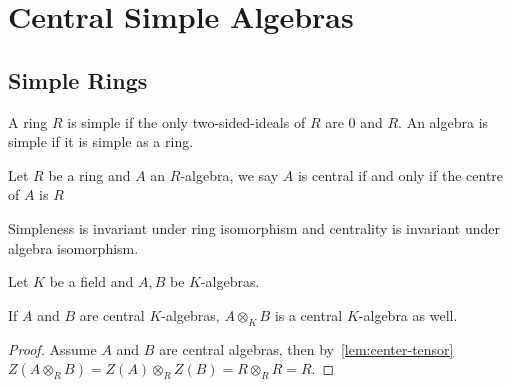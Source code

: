 \chapter{Central Simple Algebras}\label{chap:csa}

\section{Simple Rings}\label{sec:simple-ring}

\begin{definition} A ring $R$ is simple if the only two-sided-ideals of $R$ are ${0}$ and $R$. An algebra is simple if it is simple as a ring.
  \leanok
\end{definition}

\begin{definition}
  Let $R$ be a ring and $A$ an $R$-algebra, we say $A$ is central if and only if the centre of $A$ is $R$
  \leanok
\end{definition}

\begin{remark}
  Simpleness is invariant under ring isomorphism and centrality is invariant under algebra isomorphism.
\end{remark}

Let $K$ be a field and $A, B$ be $K$-algebras.
\begin{lemma}
  \label{lem:tensor-central}
  If $A$ and $B$ are central $K$-algebras, $A\otimes_{K}B$ is a central $K$-algebra as well.
  \leanok
\end{lemma}
\begin{proof}
  Assume $A$ and $B$ are central algebras, then by~\cref{lem:center-tensor}   $Z\left(A\otimes_{R}B\right)=Z\left(A\right)\otimes_{R}Z\left(B\right)=R\otimes_{R}R=R$.
\end{proof}

